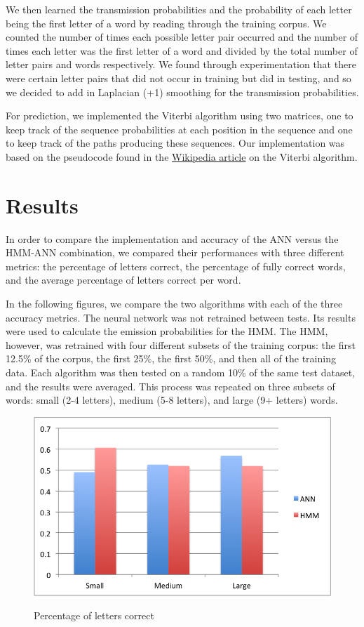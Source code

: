 \documentclass[11pt,letterpaper]{article}
\begin{document}
We then learned the transmission probabilities and the probability of each letter being the first
letter of a word by reading through the training corpus. We counted the number of times each
possible letter pair occurred and the number of times each letter was the first letter of a word and
divided by the total number of letter pairs and words respectively. We found through experimentation
that there were certain letter pairs that did not occur in training but did in testing, and so we
decided to add in Laplacian (+1) smoothing for the transmission probabilities.

For prediction, we implemented the Viterbi algorithm using two matrices, one to keep
track of the sequence probabilities at each position in the sequence and one to keep track
of the paths producing these sequences. Our implementation was based on the pseudocode
found in the \href{http://en.wikipedia.org/wiki/Viterbi_algorithm#Pseudocode}
{Wikipedia article} on the Viterbi algorithm.

\section{Results}

In order to compare the implementation and accuracy of the ANN versus the
HMM-ANN combination, we compared their performances with three different
metrics: the percentage of letters correct, the
percentage of fully correct words, and the average percentage of letters correct per word.

In the following figures, we compare the two algorithms with each of the three accuracy metrics. The
neural network was not retrained between tests. Its results were used to calculate the emission
probabilities for the HMM\@. The HMM, however, was retrained with four different subsets of the
training corpus: the first 12.5\% of the corpus, the first 25\%, the first 50\%, and then all of the
training data. Each algorithm was then tested on a random 10\% of the same test dataset, and the
results were averaged. This process was repeated on three subsets of words: small (2-4 letters),
medium (5-8 letters), and large (9+ letters) words.

\begin{figure}[h]
\centering
\caption{Percentage of letters correct}
\includegraphics[scale=0.55]{img/lettersCorrect.png}
\label{fig:lettersCorrect}
\end{figure}
\end{document}
